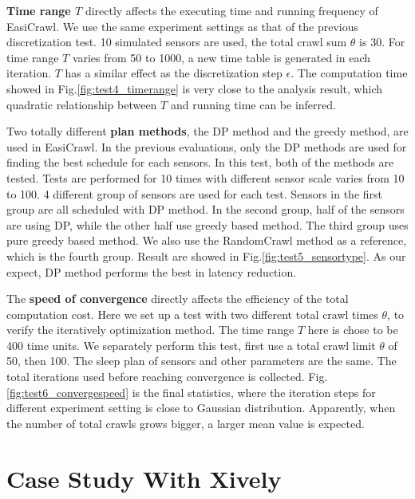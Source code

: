 \documentclass[conference]{IEEEtran}
\begin{document}
\textbf{Time range $T$} directly affects the executing time and running frequency of EasiCrawl.
We use the same experiment settings as that of the previous discretization test. 
10 simulated sensors are used, the total crawl sum $\theta$ is 30. 
For time range $T$ varies from 50 to 1000, a new time table is generated in each iteration.
$T$ has a similar effect as the discretization step $\epsilon$. 
The computation time showed in Fig.\ref{fig:test4_timerange} is very close to the analysis result, which quadratic relationship between $T$ and running time can be inferred. 

Two totally different \textbf{plan methods}, the DP method and the greedy method, are used in EasiCrawl.
In the previous evaluations, only the DP methods are used for finding the best schedule for each sensors. 
In this test, both of the methods are tested. 
Tests are performed for 10 times with different sensor scale varies from 10 to 100. 
4 different group of sensors are used for each test. 
Sensors in the first group are all scheduled with DP method.
In the second group, half of the sensors are using DP, while the other half use greedy based method. 
The third group uses pure greedy based method. 
We also use the RandomCrawl method as a reference, which is the fourth group.
Result are showed in Fig.\ref{fig:test5_sensortype}. 
As our expect, DP method performs the best in latency reduction. 

The \textbf{speed of convergence} directly affects the efficiency of the total computation cost. 
Here we set up a test with two different total crawl times $\theta$, to verify the iteratively optimization method. 
The time range $T$ here is chose to be 400 time units. 
We separately perform this test, first use a total crawl limit $\theta$ of 50, then 100. 
The sleep plan of sensors and other parameters are the same. 
The total iterations used before reaching convergence is collected.
Fig.\ref{fig:test6_convergespeed} is the final statistics, where the iteration steps for different experiment setting is close to Gaussian distribution. 
Apparently, when the number of total crawls grows bigger, a larger mean value is expected.

\section{Case Study With Xively} \label{case_study}
\end{document}
